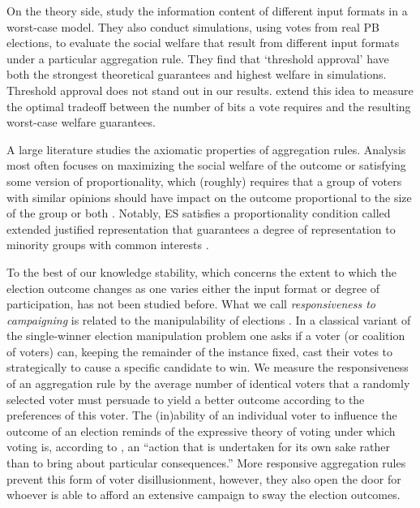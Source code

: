 \documentclass[mnsc,blindrev]{informs3_freeuse} %
\newcommand{\kibitz}[2]{\ifnum\Comments=1{\color{#1}{#2}}\fi}
\newcommand{\gb}[1]{\kibitz{red}{[GB:#1]}}
\newcommand{\mes}{ES}
\begin{document}
On the theory side, 
\citet{benade2021preference}  study the   information content of different input formats in a worst-case model.
They also conduct simulations, using votes from real PB elections,  to evaluate the social welfare that result from different input formats under a particular aggregation rule. They find that `threshold approval' have both the strongest theoretical guarantees and highest welfare in simulations. Threshold approval does not stand out in our results. \citet{MPSW19} extend this idea to measure the optimal tradeoff between the number of bits a vote requires and the resulting worst-case welfare guarantees.

A large literature studies the axiomatic properties of aggregation rules. Analysis most often focuses on maximizing the social welfare of the outcome \citep{benade2021preference,goel2019knapsack,jain2020participatory,hershkowitz2021district,talmon2019framework} %
or satisfying some version of proportionality, which (roughly) requires that a group of voters  with similar opinions should have impact on the outcome proportional to the size of the group \citep{fain2016core,aziz2017justified,sanchez2017proportional,fain2018fair,aziz2018proportionally,skowron2020participatory,peters2021proportional} or both \citep{fairstein2022welfare,michorzewski2020price}.  Notably, \mes{} satisfies a proportionality condition called extended justified representation that guarantees a degree of representation to minority groups with common interests \citep{PS20}. 

To the best of our knowledge stability, which  concerns the extent to which the election outcome changes as one varies either the input format   or degree of participation,    has not been studied before. 
What we call \emph{responsiveness to campaigning}  is   related to   the manipulability of elections \citep{Gib73,Sat75,BTT89}. In a classical variant of the single-winner election manipulation problem one asks if a voter (or  coalition of voters) can, keeping the remainder of the instance fixed,  cast their votes to strategically to cause a specific candidate to win. We measure the responsiveness of an aggregation rule by the average number of identical voters that a randomly selected voter must  persuade to yield a better outcome  according to the preferences of this voter.  
The (in)ability of an individual voter to influence the outcome of an election reminds of the expressive theory of voting \citep{brennan1984voter}   under which voting is, according to \cite{brennan1997democracy},  an ``action that is
undertaken for its own sake rather than to bring about particular consequences.''
More responsive aggregation rules prevent this form of voter disillusionment, however, they also open the door for whoever is able to afford an extensive campaign to sway the election outcomes.  
\end{document}
